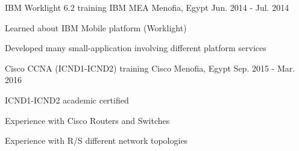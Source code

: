 

\begin{cventries}

  \cventry
    {IBM Worklight 6.2 training} %
    {IBM MEA} %
    {Menofia, Egypt} %
    {Jun. 2014 - Jul. 2014} %
    {
      \begin{cvitems} %
        \item {Learned about IBM Mobile platform (Worklight)}
        \item {Developed many small-application involving different platform services}
      \end{cvitems}
    }

  \cventry
    {Cisco CCNA (ICND1-ICND2) training} %
    {Cisco} %
    {Menofia, Egypt} %
    {Sep. 2015 - Mar. 2016} %
    {
      \begin{cvitems} %
        \item {ICND1-ICND2 academic certified}
        \item {Experience with Cisco Routers and Switches}
        \item {Experience with R/S different network topologies}
      \end{cvitems}
    }

\end{cventries}